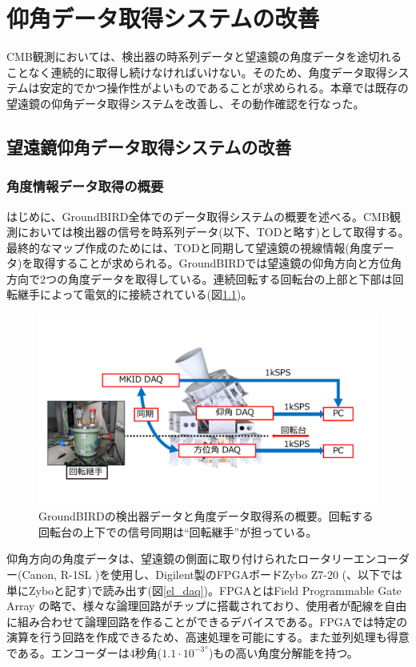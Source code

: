 \chapter{仰角データ取得システムの改善}

CMB観測においては、検出器の時系列データと望遠鏡の角度データを途切れることなく連続的に取得し続けなければいけない。そのため、角度データ取得システムは安定的でかつ操作性がよいものであることが求められる。本章では既存の望遠鏡の仰角データ取得システムを改善し、その動作確認を行なった。
\section{望遠鏡仰角データ取得システムの改善}

\subsection{角度情報データ取得の概要}
はじめに、GroundBIRD全体でのデータ取得システムの概要を述べる。CMB観測においては検出器の信号を時系列データ(以下、TODと略す)として取得する。最終的なマップ作成のためには、TODと同期して望遠鏡の視線情報(角度データ)を取得することが求められる。GroundBIRDでは望遠鏡の仰角方向と方位角方向で2つの角度データを取得している。連続回転する回転台の上部と下部は回転継手によって電気的に接続されている(図\ref{GB_daq})。

\begin{figure}[htbp]
  \centering
  \includegraphics[width=1.0\columnwidth]{4_elDAQ/figs/GB_daq_2.pdf}
  \caption{GroundBIRDの検出器データと角度データ取得系の概要。回転する回転台の上下での信号同期は``回転継手''が担っている。}
  \label{GB_daq}
\end{figure}

仰角方向の角度データは、望遠鏡の側面に取り付けられたロータリーエンコーダー(Canon, R-1SL \cite{R-1SL})を使用し、Digilent製のFPGAボードZybo Z7-20 (\cite{Zybo}、以下では単にZyboと記す)で読み出す(図\ref{el_daq})。FPGAとはField Programmable Gate Array の略で、様々な論理回路がチップに搭載されており、使用者が配線を自由に組み合わせて論理回路を作ることができるデバイスである。FPGAでは特定の演算を行う回路を作成できるため、高速処理を可能にする。また並列処理も得意である。エンコーダーは4秒角($1.1\cdot {10^{-3}}^{\circ}$)もの高い角度分解能を持つ。

